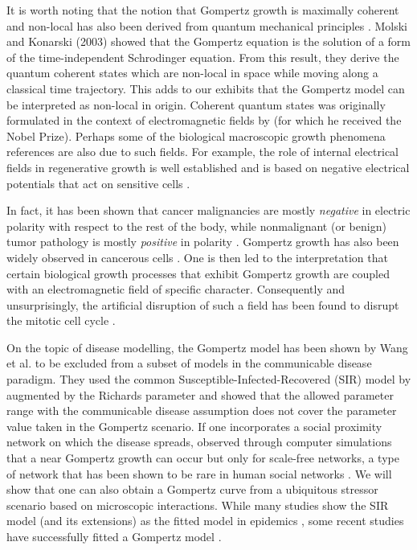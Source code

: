 \documentclass{article}
\begin{document}
It is worth noting that the notion that Gompertz growth is maximally coherent and non-local has also been derived from quantum mechanical principles \cite{molski2003coherent}. Molski and Konarski (2003) showed that the Gompertz equation is the solution of a form of the time-independent Schrodinger equation. From this result, they derive the quantum coherent states which are non-local in space while moving along a classical time trajectory. This adds to our exhibits that the Gompertz model can be interpreted as non-local in origin. Coherent quantum states was originally formulated in the context of electromagnetic fields by \citet{glauber1963coherent} (for which he received the Nobel Prize). Perhaps some of the biological macroscopic growth phenomena references are also due to such fields. For example, the role of internal electrical fields in regenerative growth is well established and is based on negative electrical potentials that act on sensitive cells \cite{becker1984electromagnetic}. 

In fact, it has been shown that cancer malignancies are mostly \textit{negative} in electric polarity with respect to the rest of the body, while nonmalignant (or benign) tumor pathology is mostly \textit{positive} in polarity \cite{langman1949technique}. Gompertz growth has also been widely observed in cancerous cells \cite{kozusko2003combining,laird1964dynamics}. One is then led to the interpretation that certain biological growth processes that exhibit Gompertz growth are coupled with an electromagnetic field of specific character. Consequently and unsurprisingly, the artificial disruption of such a field has been found to disrupt the mitotic cell cycle \cite{goodman1983pulsing,liboff1981alternating,norton1984bioelectric,liboff1984time}. 

On the topic of disease modelling, the Gompertz model has been shown by Wang et al. \cite{wang2012richards} to be excluded from a subset of models in the communicable disease paradigm. They used the common Susceptible-Infected-Recovered (SIR) model by \citet{kermack1927contribution} augmented by the Richards parameter and showed that the allowed parameter range with the communicable disease assumption does not cover the parameter value taken in the Gompertz scenario. If one incorporates a social proximity network on which the disease spreads, \citet{zonta2022virus} observed through computer simulations that a near Gompertz growth can occur but only for scale-free networks, a type of network that has been shown to be rare in human social networks \cite{clauset2009power,broido2019scale,holme2019rare}. 
We will show that one can also obtain a Gompertz curve from a ubiquitous stressor scenario based on microscopic interactions.
While many studies show the SIR model (and its extensions) as the fitted model in epidemics \cite{carletti2020covid,cooper2020sir,postnikov2020estimation,munoz2021sir,cooper2022dynamical,saikia2021covid}, some recent studies have successfully fitted a Gompertz model \cite{Ohnishi2020,Rypdal2020,Catala2020,rodrigues2020monte,Levitt2020}.
\end{document}
